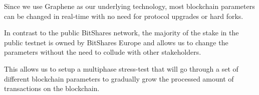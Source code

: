Since we use Graphene as our underlying technology, most blockchain parameters
can be changed in real-time with no need for protocol upgrades or hard forks.

In contrast to the public BitShares network, the majority of the stake in the
public testnet is owned by BitShares Europe and allows us to change the
parameters without the need to collude with other stakeholders.

This allows us to setup a multiphase stress-test that will go through a set of
different blockchain parameters to gradually grow the processed amount of
transactions on the blockchain.

